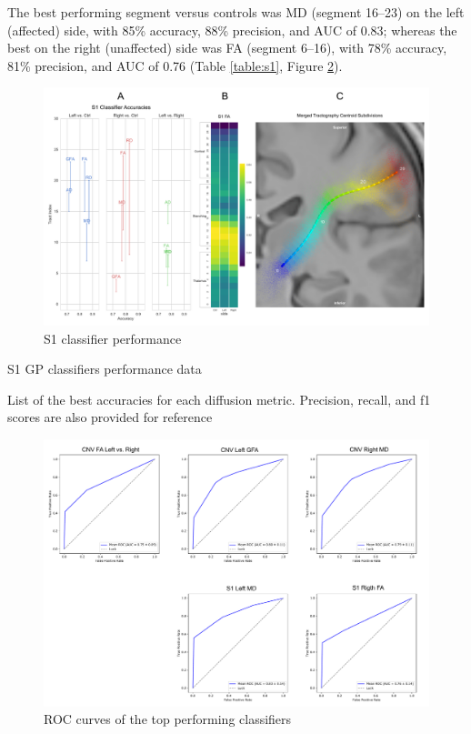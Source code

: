 The best performing segment versus controls was MD (segment 16--23) on the left (affected) side, with 85\% accuracy, 88\% precision, and AUC of 0.83; whereas the best on the right (unaffected) side was FA (segment 6--16), with 78\% accuracy, 81\% precision, and AUC of 0.76 (Table \ref{table:s1}, Figure \ref{fig:GPfigure6}). 

\begin{figure}[ht]
\centering
\includegraphics[width=\linewidth]{figure-GP-S1.pdf}
\caption{S1 classifier performance}
\label{fig:GPfigure5}
\end{figure}

\begin{table}[ht]
\centering
{}
\caption{S1 GP classifiers performance data}
\caption*{List of the best accuracies for each diffusion metric. Precision, recall, and f1 scores are also provided for reference}
\label{table:s1}
\end{table}

\begin{figure}[ht]
\centering
\includegraphics[width=\linewidth]{figure-roc.pdf}
\caption{ROC curves of the top performing classifiers}
\label{fig:GPfigure6}
\end{figure}

